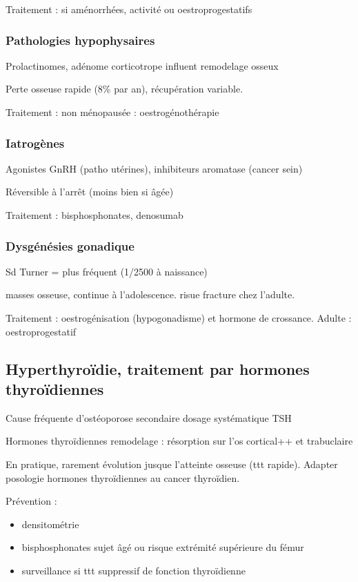 \documentclass[11pt]{article}
\begin{document}
Traitement : si aménorrhées, \dec activité ou oestroprogestatifs

\subsubsection{Pathologies hypophysaires}
\label{sec:org7c1a08d}
Prolactinomes, adénome corticotrope influent remodelage osseux

Perte osseuse rapide (8\% par an), récupération variable.

Traitement : \female non ménopausée : oestrogénothérapie

\subsubsection{Iatrogènes}
\label{sec:orgb5bc12b}
Agonistes GnRH (patho utérines), inhibiteurs aromatase (cancer sein)

Réversible à l'arrêt (moins bien si âgée)

Traitement : bisphosphonates, denosumab

\subsubsection{Dysgénésies gonadique}
\label{sec:org673f2be}
Sd Turner = plus fréquent (1/2500 à naissance)

\dec masses osseuse, continue à l'adolescence. \inc risue fracture chez
l'adulte.

Traitement : oestrogénisation (hypogonadisme) et hormone de crossance. Adulte :
oestroprogestatif

\subsection{Hyperthyroïdie, traitement par hormones thyroïdiennes}
\label{sec:org213a764}
Cause fréquente d'ostéoporose secondaire \thus dosage systématique TSH

Hormones thyroïdiennes \inc remodelage : résorption sur l'os cortical++ et trabuclaire

En pratique, rarement évolution jusque l'atteinte osseuse (ttt
rapide). Adapter posologie hormones thyroïdiennes au cancer thyroïdien.

Prévention :
\begin{itemize}
\item densitométrie
\item bisphosphonates sujet âgé ou risque extrémité supérieure du fémur
\item surveillance si ttt suppressif de fonction thyroïdienne
\end{itemize}
\end{document}
